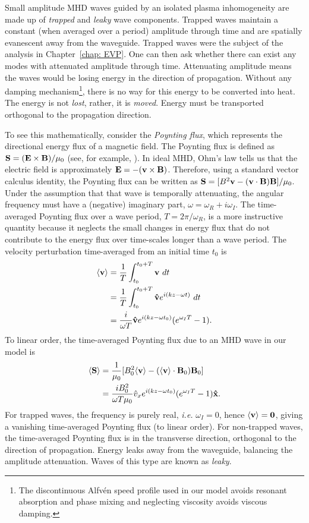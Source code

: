 \documentclass[12pt]{../style-files/ociamthesis}
\begin{document}
Small amplitude MHD waves guided by an isolated plasma inhomogeneity are made up of \textit{trapped} and \textit{leaky} wave components. Trapped waves maintain a constant (when averaged over a period) amplitude through time and are spatially evanescent away from the waveguide. Trapped waves were the subject of the analysis in Chapter~\ref{chap: EVP}. One can then ask whether there can exist any modes with attenuated amplitude through time. Attenuating amplitude means the waves would be losing energy in the direction of propagation. Without any damping mechanism\footnote{The discontinuous Alfv\'{e}n speed profile used in our model avoids resonant absorption and phase mixing and neglecting viscosity avoids viscous damping.}, there is no way for this energy to be converted into heat. The energy is not \textit{lost}, rather, it is \textit{moved}. Energy must be transported orthogonal to the propagation direction.

To see this mathematically, consider the \textit{Poynting flux}, which represents the directional energy flux of a magnetic field. The Poynting flux is defined as $\mathbf{S} = (\mathbf{E} \times \mathbf{B})/\mu_0$ (see, for example, \citealp{pri14}). In ideal MHD, Ohm's law tells us that the electric field is approximately $\mathbf{E} = -(\mathbf{v} \times \mathbf{B})$. Therefore, using a standard vector calculus identity, the Poynting flux can be written as $\mathbf{S} = [B^2\mathbf{v} - (\mathbf{v} \cdot \mathbf{B})\mathbf{B}] / \mu_0$. Under the assumption that that wave is temporally attenuating, the angular frequency must have a (negative) imaginary part, $\omega = \omega_R + i\omega_I$. The time-averaged Poynting flux over a wave period, $T = 2\pi/\omega_R$, is a more instructive quantity because it neglects the small changes in energy flux that do not contribute to the energy flux over time-scales longer than a wave period. The velocity perturbation time-averaged from an initial time $t_0$ is
\begin{align}
	\langle \mathbf{v} \rangle &= \frac{1}{T} \int_{t_0}^{t_0 + T} \mathbf{v} ~dt \\
	&= \frac{1}{T} \int_{t_0}^{t_0 + T} \mathbf{\hat{v}} e^{i(kz - \omega t)} ~dt \\
	&= \frac{i}{\omega T} \mathbf{\hat{v}} e^{i(kz - \omega t_0)} (e^{\omega_I T} - 1).
\end{align}
To linear order, the time-averaged Poynting flux due to an MHD wave in our model is
\begin{align}
\langle \mathbf{S} \rangle &= \frac{1}{\mu_0}[B_0^2\langle\mathbf{v}\rangle - (\langle\mathbf{v}\rangle \cdot \mathbf{B}_0)\mathbf{B}_0] \\
&= \frac{iB_0^2}{\omega T \mu_0} \hat{v}_x e^{i(kz - \omega t_0)} (e^{\omega_I T} - 1) \mathbf{\hat{x}}.
\end{align}
For trapped waves, the frequency is purely real, \textit{i.e.} $\omega_I = 0$, hence $\langle \mathbf{v} \rangle = \mathbf{0}$, giving a vanishing time-averaged Poynting flux (to linear order). For non-trapped waves, the time-averaged Poynting flux is in the transverse direction, orthogonal to the direction of propagation. Energy leaks away from the waveguide, balancing the amplitude attenuation. Waves of this type are known as \textit{leaky}.
\end{document}
